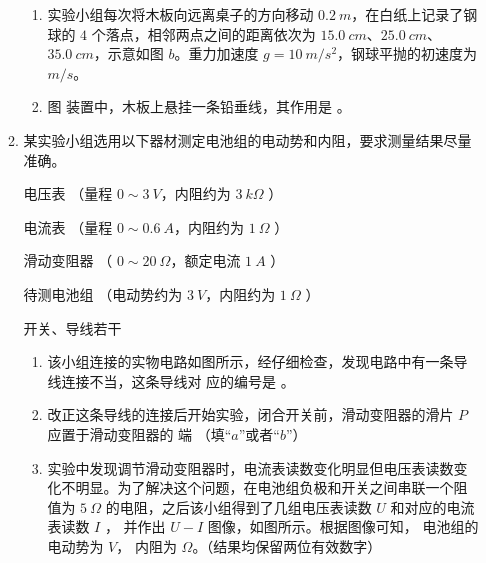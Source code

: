 \begin{enumerate}
\begin{enumerate}
\begin{enumerate}
\item 
实验小组每次将木板向远离桌子的方向移动 $ 0.2 \ m $，在白纸上记录了钢球的 $ 4 $ 个落点，相邻两点之间的距离依次为 $ 15.0 \ cm $、$ 25.0 \ cm $、$ 35.0 \ cm $，示意如图 $ b $。重力加速度 $ g=10 \ m/s^{2} $，钢球平抛的初速度为 \underlinegap $ m/s $。

\item 
图  装置中，木板上悬挂一条铅垂线，其作用是 \hfullline 。

\end{enumerate}







\item 
某实验小组选用以下器材测定电池组的电动势和内阻，要求测量结果尽量准确。


电压表 \qquad （量程 $ 0 \sim 3 \ V $，内阻约为 $ 3 \ k \Omega $ ）

电流表 \qquad （量程 $ 0 \sim 0.6 \ A $，内阻约为 $ 1 \ \Omega $ ）

滑动变阻器 \qquad （ $ 0 \sim 20 \ \Omega $，额定电流 $ 1 \ A $ ）

待测电池组 \qquad （电动势约为 $ 3 \ V $，内阻约为 $ 1 \ \Omega $ ）

开关、导线若干

\begin{enumerate}
\item
该小组连接的实物电路如图所示，经仔细检查，发现电路中有一条导线连接不当，这条导线对
应的编号是 \underlinegap 。
\begin{figure}[h!]
\centering

\end{figure}


\item 
改正这条导线的连接后开始实验，闭合开关前，滑动变阻器的滑片 $ P $ 应置于滑动变阻器的
端 \underlinegap （填“$ a $”或者“$ b $”）

\item 
实验中发现调节滑动变阻器时，电流表读数变化明显但电压表读数变化不明显。为了解决这个问题，在电池组负极和开关之间串联一个阻值为 $ 5 \ \Omega $ 的电阻，之后该小组得到了几组电压表读数 $ U $
和对应的电流表读数 $ I $ ，
并作出 $ U-I $ 图像，如图所示。根据图像可知，
电池组的电动势为 \underlinegap $ V $，
内阻为 \underlinegap $ \Omega $。（结果均保留两位有效数字）
\begin{figure}[h!]
\centering

\end{figure}


\end{enumerate}
\end{enumerate}
\end{enumerate}
